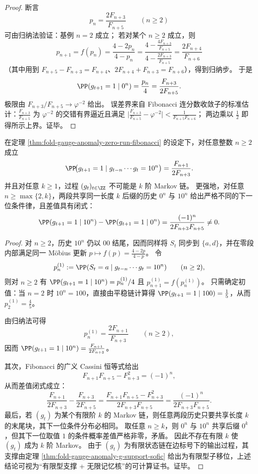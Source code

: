 \begin{proof}
\par
断言
\[
p_n=\frac{2F_{n+3}}{F_{n+5}}\qquad(n\ge 2)
\]
可由归纳法验证：基例 \(n=2\) 成立；
若对某个 \(n\ge 2\) 成立，则
\[
p_{n+1}=f(p_n)=\frac{4-2p_n}{4-p_n}
=\frac{4-\frac{4F_{n+3}}{F_{n+5}}}{4-\frac{2F_{n+3}}{F_{n+5}}}
=\frac{2F_{n+4}}{F_{n+6}}
\]
（其中用到 \(F_{n+5}-F_{n+3}=F_{n+4}\)、\(2F_{n+4}+F_{n+3}=F_{n+6}\)），得到归纳步。
于是
\[
\PP(g_{t+1}=1\mid 0^n)=\frac{p_n}{4}=\frac{F_{n+3}}{2F_{n+5}}.
\]
极限由 \(F_{n+3}/F_{n+5}\to\varphi^{-2}\) 给出。
误差界来自 Fibonacci 连分数收敛子的标准估计：\(\frac{F_{n+3}}{F_{n+5}}\) 为 \(\varphi^{-2}\) 的交错有界逼近且满足
\(
\bigl|\frac{F_{n+3}}{F_{n+5}}-\varphi^{-2}\bigr|<\frac{1}{F_{n+5}F_{n+6}}
\)；
两边乘以 \(\tfrac12\) 即得所示上界。证毕。
\end{proof}

\begin{theorem}\label{thm:fold-gauge-anomaly-strictly-sofic-infinite-memory}
在定理 \ref{thm:fold-gauge-anomaly-zero-run-fibonacci} 的设定下，对任意整数 \(n\ge 2\) 成立
\[
\PP\!\bigl(g_{t+1}=1\mid g_{t-n}\cdots g_t=10^n\bigr)=\frac{F_{n+1}}{2F_{n+3}}.
\]
并且对任意 \(k\ge 1\)，过程 \((g_t)_{t\in\ZZ}\) 不可能是 \(k\) 阶 Markov 链。
更强地，对任意 \(n\ge \max\{2,k\}\)，两段共享同一长度 \(k\) 后缀的历史 \(0^n\) 与 \(10^n\) 给出严格不同的下一位条件律，且差值具有闭式：
\[
\PP(g_{t+1}=1\mid 10^n)-\PP(g_{t+1}=1\mid 0^n)
=\frac{(-1)^n}{2F_{n+3}F_{n+5}}\neq 0.
\]
\end{theorem}
\begin{proof}
对 \(n\ge 2\)，历史 \(10^n\) 仍以 \(00\) 结尾，因而同样将 \(S_t\) 同步到 \(\{a,d\}\)，并在零段内部满足同一 Möbius 更新 \(p\mapsto f(p)=\frac{4-2p}{4-p}\)。
令
\[
p^{(1)}_n:=\PP(S_t=a\mid g_{t-n}\cdots g_t=10^n)\qquad(n\ge 2),
\]
则对 \(n\ge 2\) 有 \(\PP(g_{t+1}=1\mid 10^n)=p^{(1)}_n/4\) 且 \(p^{(1)}_{n+1}=f(p^{(1)}_n)\)。
只需确定初值：当 \(n=2\) 时 \(10^n=100\)，直接由平稳链计算得 \(\PP(g_{t+1}=1\mid 100)=\frac15\)，从而 \(p^{(1)}_2=\frac45\)。
\par
由归纳法可得
\[
p^{(1)}_n=\frac{2F_{n+1}}{F_{n+3}}\qquad(n\ge 2),
\]
因而
\(
\PP(g_{t+1}=1\mid 10^n)=\frac{F_{n+1}}{2F_{n+3}}
\)。
\par
其次，Fibonacci 的广义 Cassini 恒等式给出
\[
F_{n+1}F_{n+5}-F_{n+3}^2 = (-1)^n,
\]
从而差值闭式成立：
\[
\frac{F_{n+1}}{2F_{n+3}}-\frac{F_{n+3}}{2F_{n+5}}
=\frac{F_{n+1}F_{n+5}-F_{n+3}^2}{2F_{n+3}F_{n+5}}
=\frac{(-1)^n}{2F_{n+3}F_{n+5}}.
\]
最后，若 \((g_t)\) 为某个有限阶 \(k\) 的 Markov 链，则任意两段历史只要共享长度 \(k\) 的末尾块，其下一位条件分布必相同。
取任意 \(n\ge k\)，则 \(0^n\) 与 \(10^n\) 共享后缀 \(0^k\)，但其下一位取值 \(1\) 的条件概率差值严格非零，矛盾。
因此不存在有限 \(k\) 使 \((g_t)\) 成为 \(k\) 阶 Markov。
由于 \((g_t)\) 为有限状态链在边标号下的输出过程，其支撑由定理 \ref{thm:fold-gauge-anomaly-g-support-sofic} 给出为有限型子移位，上述结论可视为“有限型支撑 + 无限记忆核”的可计算证书。证毕。
\end{proof}

